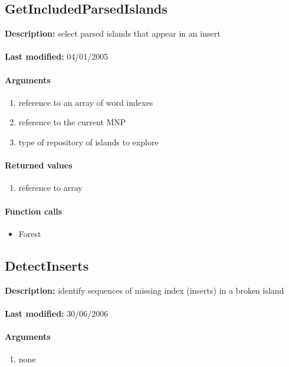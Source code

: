 \subsection{GetIncludedParsedIslands}
\textbf{Description:} select parsed islands that appear in an insert\\
\\\textbf{Last modified:} 04/01/2005

\paragraph{Arguments}
\begin{enumerate}
\item reference to an array of word indexes
\item reference to the current MNP
\item type of repository of islands to explore
\end{enumerate}

\paragraph{Returned values}
\begin{enumerate}
\item reference to array
\end{enumerate}

\paragraph{Function calls}
\begin{itemize}
\item Forest
\end{itemize}

\subsection{DetectInserts}
\textbf{Description:} identify sequences of missing index (inserts) in a broken island\\
\\\textbf{Last modified:} 30/06/2006

\paragraph{Arguments}
\begin{enumerate}
\item none
\end{enumerate}


